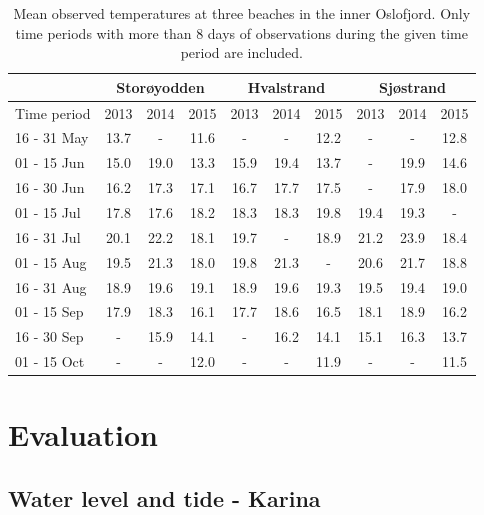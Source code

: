 \documentclass[12pt,a4paper,english]{article}
\begin{document}
\begin{table}[ht]
\caption{Mean observed temperatures at three beaches in the inner Oslofjord. Only time periods with more than 8 days of observations during the given time period are included.}
\label{tab:temp_strand}
\begin{center}
\begin{tabular}{|l|ccc|ccc|ccc|} \hline
     & \multicolumn{3}{c|}{Stor\o yodden} & \multicolumn{3}{c|}{Hvalstrand} & \multicolumn{3}{c|}{Sj\o strand} \\ \hline
Time period & 2013 & 2014 & 2015 & 2013 & 2014 & 2015 & 2013 & 2014 & 2015 \\ \hline
16 - 31 May & 13.7 &  -   & 11.6 &  -   &  -   & 12.2 &  -   &  -   & 12.8 \\ 
01 - 15 Jun & 15.0 & 19.0 & 13.3 & 15.9 & 19.4 & 13.7 &  -   & 19.9 & 14.6 \\ 
16 - 30 Jun & 16.2 & 17.3 & 17.1 & 16.7 & 17.7 & 17.5 &  -   & 17.9 & 18.0 \\ 
01 - 15 Jul & 17.8 & 17.6 & 18.2 & 18.3 & 18.3 & 19.8 & 19.4 & 19.3 &  -   \\ 
16 - 31 Jul & 20.1 & 22.2 & 18.1 & 19.7 &  -   & 18.9 & 21.2 & 23.9 & 18.4 \\ 
01 - 15 Aug & 19.5 & 21.3 & 18.0 & 19.8 & 21.3 &  -   & 20.6 & 21.7 & 18.8 \\ 
16 - 31 Aug & 18.9 & 19.6 & 19.1 & 18.9 & 19.6 & 19.3 & 19.5 & 19.4 & 19.0 \\ 
01 - 15 Sep & 17.9 & 18.3 & 16.1 & 17.7 & 18.6 & 16.5 & 18.1 & 18.9 & 16.2 \\ 
16 - 30 Sep &  -   & 15.9 & 14.1 &  -   & 16.2 & 14.1 & 15.1 & 16.3 & 13.7 \\ 
01 - 15 Oct &  -   &  -   & 12.0 &  -   &  -   & 11.9 &  -   &  -   & 11.5 \\ 
\hline
\end{tabular}
\end{center}
\end{table}



\clearpage
\section{Evaluation}
\subsection{Water level and tide - Karina}
\end{document}
